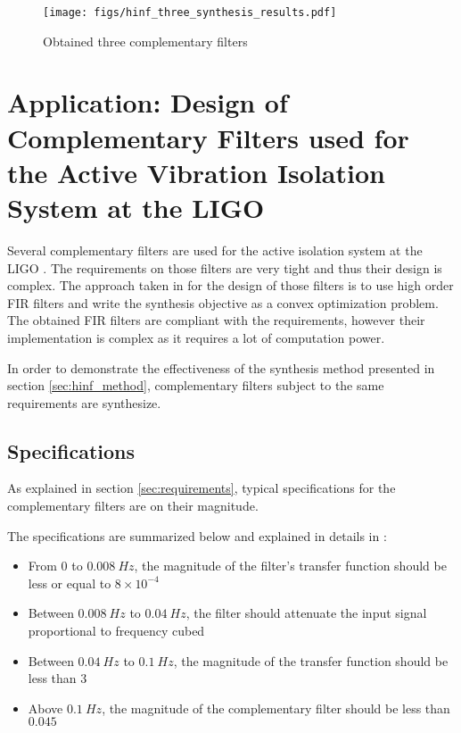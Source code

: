 \documentclass[letterpaper, 10 pt, conference]{ieeeconf}
\begin{document}
\begin{figure}[htbp]
\centering
\texttt{[image: figs/hinf\_three\_synthesis\_results.pdf]}
\caption{\label{fig:hinf_three_synthesis_results}
Obtained three complementary filters}
\end{figure}

\section{Application: Design of Complementary Filters used for the Active Vibration Isolation System at the LIGO}
\label{sec:org8dbdcd2}
\label{sec:application_ligo}
Several complementary filters are used for the active isolation system at the LIGO \cite{hua05_low_ligo,hua04_polyp_fir_compl_filter_contr_system}.
The requirements on those filters are very tight and thus their design is complex.
The approach taken in \cite{hua05_low_ligo} for the design of those filters is to use high order FIR filters and write the synthesis objective as a convex optimization problem.
The obtained FIR filters are compliant with the requirements, however their implementation is complex as it requires a lot of computation power.

In order to demonstrate the effectiveness of the synthesis method presented in section \ref{sec:hinf_method}, complementary filters subject to the same requirements are synthesize.
\subsection{Specifications}
\label{sec:org684e797}
\label{sec:ligo_specifications}

As explained in section \ref{sec:requirements}, typical specifications for the complementary filters are on their magnitude.

The specifications are summarized below and explained in details in \cite{hua04_polyp_fir_compl_filter_contr_system}:
\begin{itemize}
\item From \(0\) to \(\SI{0.008}{Hz}\), the magnitude of the filter's transfer function should be less or equal to \(8 \times 10^{-4}\)
\item Between \(\SI{0.008}{Hz}\) to \(\SI{0.04}{Hz}\), the filter should attenuate the input signal proportional to frequency cubed
\item Between \(\SI{0.04}{Hz}\) to \(\SI{0.1}{Hz}\), the magnitude of the transfer function should be less than \(3\)
\item Above \(\SI{0.1}{Hz}\), the magnitude of the complementary filter should be less than \(0.045\)
\end{itemize}
\end{document}

